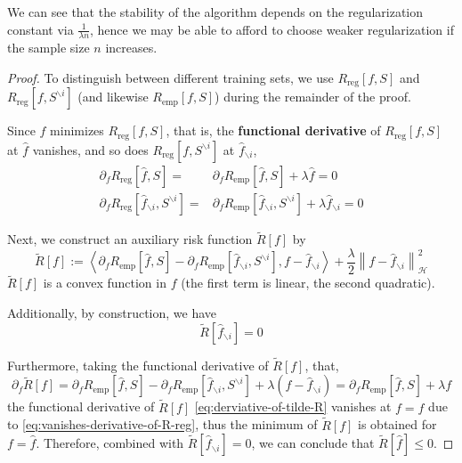 \begin{remark}
	We can see that the stability of the algorithm depends on the regularization constant via $\frac{1}{\lambda n}$, hence we may be able to afford to choose weaker regularization if the sample size $n$ increases.
\end{remark}

\begin{proof}
	To distinguish between different training sets, we use $R_{\text{reg}}[f, S]$ and $R_{\text{reg}}[f, S^{\backslash i}]$ (and likewise $R_{\text{emp}}[f, S]$) during the remainder of the proof.

	Since $\hat{f}$ minimizes $R_{\text{reg}}[f,S]$, that is, the \textbf{functional derivative} \cite{stephane2014lecture} of $R_{\text{reg}}[f,S]$ at $\hat{f}$ vanishes, and so does $R_{\text{reg}}[f,S^{\backslash i}]$ at $\hat{f}_{\backslash i}$,
	\begin{equation}
		\label{eq:vanishes-derivative-of-R-reg}
		\begin{aligned}
			\partial_{f}R_{\text{reg}}\left[\hat{f},S\right]=                               & \partial_{f}R_{\text{emp}}\left[\hat{f},S\right]+\lambda\hat{f}=0                                              \\
			\partial_{f}R_{\text{reg}}\left[\hat{f}_{\backslash i},S^{\backslash i}\right]= & \partial_{f}R_{\text{emp}}\left[\hat{f}_{\backslash i},S^{\backslash i}\right]+\lambda\hat{f}_{\backslash i}=0
		\end{aligned}
	\end{equation}

	Next, we construct an auxiliary risk function $\tilde{R}[f]$ by
	\begin{equation}
		\tilde{R}[f]:=\left\langle\partial_{f}R_{\text{emp}}\left[\hat{f},S\right]-\partial_{f}R_{\text{emp}}\left[\hat{f}_{\backslash i},S^{\backslash i}\right],f-\hat{f}_{\backslash i}\right\rangle+\frac{\lambda}{2}\left\|f-\hat{f}_{\backslash i}\right\|_{\mathcal{H}}^{2}
	\end{equation}
	$\tilde{R}[f]$ is a convex function in $f$ (the first term is linear, the second quadratic).

	Additionally, by construction, we have
	\begin{equation}
		\tilde{R}[\hat{f}_{\backslash i}]=0
	\end{equation}

	Furthermore, taking the functional derivative of $\tilde{R}[f]$, that,
	\begin{equation}
		\label{eq:derviative-of-tilde-R}
		\partial_{f}\tilde{R}[f]=\partial_{f}R_{\text{emp}}\left[\hat{f},S\right]-\partial_{f}R_{\text{emp}}\left[\hat{f}_{\backslash i},S^{\backslash i}\right]+\lambda\left(f-\hat{f}_{\backslash i}\right)=\partial_{f}R_{\text{emp}}\left[\hat{f},S\right]+\lambda f
	\end{equation}
	the functional derivative of $\tilde{R}[f]$ \eqref{eq:derviative-of-tilde-R} vanishes at $f=\hat{f}$ due to \eqref{eq:vanishes-derivative-of-R-reg}, thus the minimum of $\tilde{R}[f]$ is obtained for $f=\hat{f}$. Therefore, combined with $\tilde{R}[\hat{f}_{\backslash i}]=0$, we can conclude that $\tilde{R}[\hat{f}]\leq 0$.


\end{proof}
